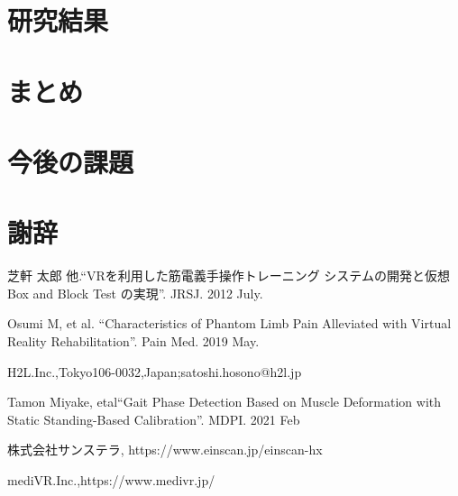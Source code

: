 \documentclass{ltjsreport}
\begin{document}
\chapter{研究結果}
\chapter{まとめ}

\chapter{今後の課題}
\clearpage

\chapter*{謝辞}

\begin{thebibliography}{99}

	芝軒 太郎 他.``VRを利用した筋電義手操作トレーニング
	システムの開発と仮想 Box and Block Test の実現''.
	JRSJ. 2012 July.

	Osumi M, et al.
	``Characteristics of Phantom Limb Pain Alleviated
	with Virtual Reality Rehabilitation''.
	Pain Med. 2019 May.

	H2L.Inc.,Tokyo106-0032,Japan;satoshi.hosono@h2l.jp

	Tamon Miyake, etal``Gait Phase Detection Based on Muscle Deformation
	with Static Standing-Based Calibration''.
	MDPI. 2021 Feb

	株式会社サンステラ, https://www.einscan.jp/einscan-hx

	mediVR.Inc.,https://www.medivr.jp/

\end{thebibliography}
\end{document}
